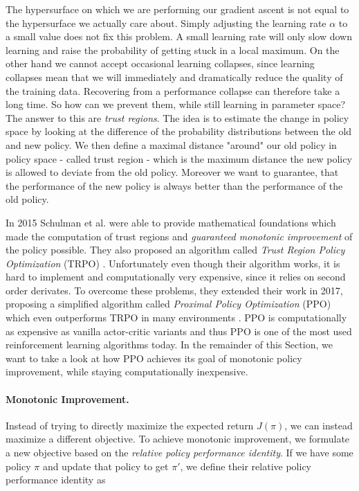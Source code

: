 The hypersurface on which we are performing our gradient ascent is not equal to the hypersurface we actually care about. Simply adjusting the learning rate $\alpha$ to a small value does not fix this problem. A small learning rate will only slow down learning and raise the probability of getting stuck in a local maximum. On the other hand we cannot accept occasional learning collapses, since learning collapses mean that we will immediately and dramatically reduce the quality of the training data. Recovering from a performance collapse can therefore take a long time. So how can we prevent them, while still learning in parameter space? The answer to this are \textit{trust regions}. The idea is to estimate the change in policy space by looking at the difference of the probability distributions between the old and new policy. We then define a maximal distance "around" our old policy in policy space - called trust region - which is the maximum distance the new policy is allowed to deviate from the old policy. Moreover we want to guarantee, that the performance of the new policy is always better than the performance of the old policy.

In 2015 Schulman et al. were able to provide mathematical foundations which made the computation of trust regions and \textit{guaranteed monotonic improvement} of the policy possible. They also proposed an algorithm called \textit{Trust Region Policy Optimization} (TRPO) \cite{schulman2015trust}. Unfortunately even though their algorithm works, it is hard to implement and computationally very expensive, since it relies on second order derivates. To overcome these problems, they extended their work in 2017, proposing a simplified algorithm called \textit{Proximal Policy Optimization} (PPO) which even outperforms TRPO in many environments \cite{schulman2017proximal}. PPO is computationally as expensive as vanilla actor-critic variants and thus PPO is one of the most used reinforcement learning algorithms today. In the remainder of this Section, we want to take a look at how PPO achieves its goal of monotonic policy improvement, while staying computationally inexpensive.

\paragraph{Monotonic Improvement.}
Instead of trying to directly maximize the expected return $J(\pi)$, we can instead maximize a different objective. To achieve monotonic improvement, we formulate a new objective based on the \textit{relative policy performance identity}. If we have some policy $\pi$ and update that policy to get $\pi'$, we define their relative policy performance identity as

